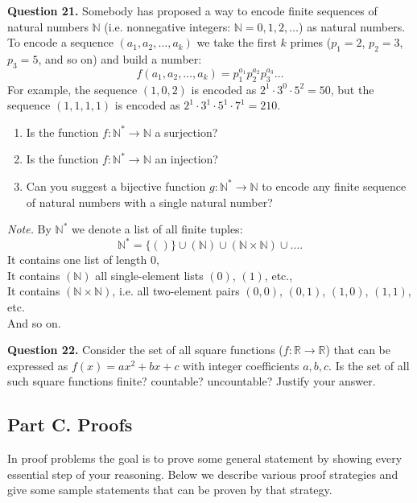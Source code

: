 \documentclass[jou]{apa6}
\begin{document}
\vspace{6pt}
{\bf Question 21.} Somebody has proposed a way to encode finite sequences of natural numbers $\mathbb{N}$
(i.e. nonnegative integers: $\mathbb{N} = 0,1,2,\ldots$) as natural numbers. 
To encode a sequence $(a_1,a_2,\ldots,a_k)$ we take the first $k$ primes
($p_1 = 2$, $p_2 = 3$, $p_3 = 5$, and so on) and build a number: 
$$f(a_1,a_2,\ldots,a_k) = p_1^{a_1}p_2^{a_2}p_3^{a_3}\ldots$$
For example, the sequence $(1,0,2)$ is encoded as $2^1\cdot{} 3^0 \cdot 5^2 = 50$, 
but the sequence $(1,1,1,1)$ is encoded as $2^1 \cdot 3^1 \cdot 5^1 \cdot 7^1 =  210$.
\begin{enumerate}
\item Is the function $f: \mathbb{N}^{\ast} \rightarrow \mathbb{N}$ a surjection?
\item Is the function $f: \mathbb{N}^{\ast} \rightarrow \mathbb{N}$ an injection?
\item Can you suggest a bijective function $g: \mathbb{N}^{\ast} \rightarrow \mathbb{N}$ to encode any finite sequence of natural numbers 
with a single natural number?
\end{enumerate}

{\em Note.} By $\mathbb{N}^{\ast}$ we denote a list of all finite tuples: 
$$\mathbb{N}^{\ast} = \{()\} \cup (\mathbb{N}) \cup (\mathbb{N} \times \mathbb{N}) \cup \ldots.$$
It contains one list of length $0$,\\
It contains $(\mathbb{N})$ all single-element lists $(0)$, $(1)$, etc.,\\
It contains $(\mathbb{N} \times \mathbb{N})$, i.e. all two-element pairs $(0,0)$, $(0,1)$, $(1,0)$, $(1,1)$, etc.\\
And so on.

\vspace{6pt}
{\bf Question 22.} Consider the set of all square functions ($f:\mathbb{R} \rightarrow \mathbb{R}$)
that can be expressed as $f(x) = ax^2 + bx + c$ with integer coefficients $a,b,c$. 
Is the set of all such square functions finite? countable? uncountable? 
Justify your answer.





\subsection{Part C. Proofs}

In proof problems the goal is to prove some general statement by 
showing every essential step of your reasoning.
Below we describe various proof strategies and give some sample
statements that can be proven by that strategy.
\end{document}
